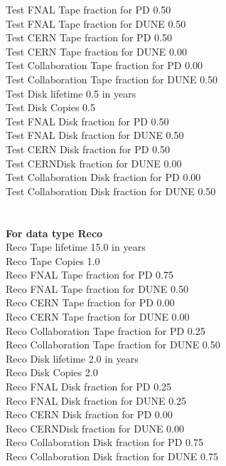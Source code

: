 \documentclass[12pt]{article}
\begin{document}
  Test FNAL Tape fraction for PD  0.50\\
  Test FNAL Tape fraction for DUNE  0.50\\
  Test CERN Tape fraction for PD  0.50\\
  Test CERN Tape fraction for DUNE  0.00\\
  Test Collaboration Tape fraction for PD  0.00\\
  Test Collaboration Tape fraction for DUNE  0.50\\
  Test Disk lifetime   0.5 in years\\
  Test Disk Copies   0.5\\
  Test FNAL Disk fraction for PD  0.50\\
  Test FNAL Disk fraction for DUNE  0.50\\
  Test CERN Disk fraction for PD  0.50\\
  Test CERNDisk fraction for DUNE  0.00\\
  Test Collaboration Disk fraction for PD  0.00\\
  Test Collaboration Disk fraction for DUNE  0.50\\
\pagebreak\\
\\
{\bf For data type Reco}\\
  Reco Tape lifetime  15.0 in years\\
  Reco Tape Copies   1.0\\
  Reco FNAL Tape fraction for PD  0.75\\
  Reco FNAL Tape fraction for DUNE  0.50\\
  Reco CERN Tape fraction for PD  0.00\\
  Reco CERN Tape fraction for DUNE  0.00\\
  Reco Collaboration Tape fraction for PD  0.25\\
  Reco Collaboration Tape fraction for DUNE  0.50\\
  Reco Disk lifetime   2.0 in years\\
  Reco Disk Copies   2.0\\
  Reco FNAL Disk fraction for PD  0.25\\
  Reco FNAL Disk fraction for DUNE  0.25\\
  Reco CERN Disk fraction for PD  0.00\\
  Reco CERNDisk fraction for DUNE  0.00\\
  Reco Collaboration Disk fraction for PD  0.75\\
  Reco Collaboration Disk fraction for DUNE  0.75\\
\end{document}
